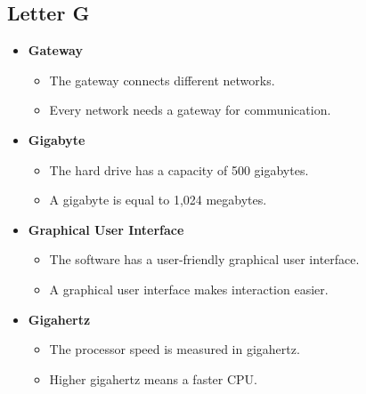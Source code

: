 \subsection{Letter G}
\begin{itemize}
    \item \textbf{Gateway}
    \begin{itemize}
        \item The gateway connects different networks.
        \item Every network needs a gateway for communication.
    \end{itemize}
    \item \textbf{Gigabyte}
    \begin{itemize}
        \item The hard drive has a capacity of 500 gigabytes.
        \item A gigabyte is equal to 1,024 megabytes.
    \end{itemize}
    \item \textbf{Graphical User Interface}
    \begin{itemize}
        \item The software has a user-friendly graphical user interface.
        \item A graphical user interface makes interaction easier.
    \end{itemize}
    \item \textbf{Gigahertz}
    \begin{itemize}
        \item The processor speed is measured in gigahertz.
        \item Higher gigahertz means a faster CPU.
    \end{itemize}
\end{itemize}

